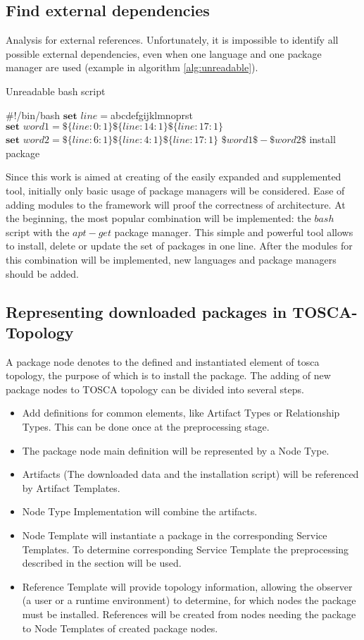 \subsection{Find external dependencies}
Analysis for external references.
Unfortunately, it is impossible to identify all possible external dependencies, even when one language and one package manager are used (example in algorithm \ref{alg:unreadable}).
\begin{Algorithmus} 
	\caption{Unreadable bash script}
	\label{alg:unreadable}
	\begin{algorithmic}
		\State	\#!/bin/bash
		\State	$\textbf{set } line = $abcdefgijklmnoprst
		\State	$\textbf{set } word1 = \$\{line:0:1\}\$\{line:14:1\}\$\{line:17:1\}$ 
		\State  $\textbf{set } word2 = \$\{line:6:1\}\$\{line:4:1\}\$\{line:17:1\}$
		\State  $\$word1\$-\$word2\$$ install package
	\end{algorithmic}
\end{Algorithmus}   
Since this work is aimed at creating of the easily expanded and supplemented tool, initially only basic usage of package managers will be considered.
Ease of adding modules to the framework will proof the correctness of architecture.
At the beginning, the most popular combination will be implemented: the $bash$ script with the $apt-get$ package manager.
This simple and powerful tool allows to install, delete or update the set of packages in one line.
After the modules for this combination will be implemented, new languages and package managers should be added.
\subsection{Representing downloaded packages in TOSCA-Topology} \label{subs:repres}
A package node denotes to the defined and instantiated element of \gls{tosca} topology, the purpose of which is to install the package.
The adding of new package nodes to TOSCA topology can be divided into several steps.
\begin{itemize}
	\item Add definitions for common elements, like Artifact Types or Relationship Types. 
		This can be done once at the preprocessing stage.
	\item The package node main definition will be represented by a Node Type. 
	\item Artifacts (The downloaded data and the installation script) will be referenced by Artifact Templates.
	\item Node Type Implementation will combine the artifacts.
	\item Node Template will instantiate a package in the corresponding Service Templates.
		To determine corresponding Service Template the preprocessing described in the section  will be used.
	\item Reference Template will provide topology information, allowing the observer (a user or a runtime environment) to determine, for which nodes the package must be installed.
		References will be created from nodes needing the package to Node Templates of created package nodes.
\end{itemize}
